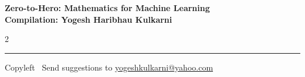 \documentclass[8pt,landscape]{article}
\begin{document}
\footnotesize


\begin{center}
\Large{\textbf{Zero-to-Hero: Mathematics for Machine Learning\\ Compilation: Yogesh Haribhau Kulkarni}}
\end{center}

\begin{multicols}{2}

\end{multicols}

\rule{\linewidth}{0.25pt}
\scriptsize
Copyleft \textcopyleft\  Send suggestions to
\href{http://www.yogeshkulkarni.com}{yogeshkulkarni@yahoo.com}
\end{document}
